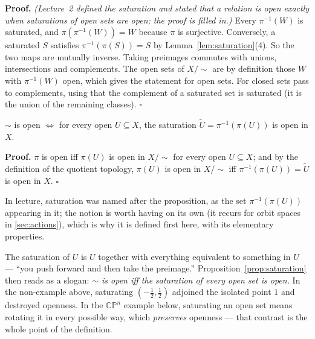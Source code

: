\documentclass[11pt]{report}
\makeatletter
\newcounter{thmcounter}[section]
\renewenvironment{proof}[1][Proof]{\noindent\textbf{#1.} }{\hfill$\square$\par\vspace{5pt}}
\newcommand{\thmlabel}[1]{\edef\@currentlabel{\arabic{section}.\arabic{thmcounter}}\label{#1}}
\makeatother
\begin{document}
\begin{proof}
\textit{(Lecture~2 defined the saturation and stated that a relation is open exactly when saturations of open sets are open; the proof is filled in.)} Every $\pi^{-1}(W)$ is saturated, and $\pi(\pi^{-1}(W)) = W$ because $\pi$ is surjective. Conversely, a saturated $S$ satisfies $\pi^{-1}(\pi(S)) = S$ by Lemma~\ref{lem:saturation}(4). So the two maps are mutually inverse. Taking preimages commutes with unions, intersections and complements. The open sets of $X/{\sim}$ are by definition those $W$ with $\pi^{-1}(W)$ open, which gives the statement for open sets. For closed sets pass to complements, using that the complement of a saturated set is saturated (it is the union of the remaining classes).
\end{proof}

\begin{propbox}\thmlabel{prop:saturation}
$\sim$ is open $\iff$ for every open $U \subseteq X$, the saturation $\tilde U = \pi^{-1}(\pi(U))$ is open in $X$.
\end{propbox}

\begin{proof}
$\pi$ is open iff $\pi(U)$ is open in $X/{\sim}$ for every open $U \subseteq X$; and by the definition of the quotient topology, $\pi(U)$ is open in $X/{\sim}$ iff $\pi^{-1}(\pi(U)) = \tilde U$ is open in $X$.
\end{proof}

In lecture, saturation was named after the proposition, as the set $\pi^{-1}(\pi(U))$ appearing in it; the notion is worth having on its own (it recurs for orbit spaces in \ref{sec:actions}), which is why it is defined first here, with its elementary properties.

\begin{rembox}[In Words]\label{rem:words}
The saturation of $U$ is $U$ together with everything equivalent to something in $U$ --- ``you push forward and then take the preimage.'' Proposition~\ref{prop:saturation} then reads as a slogan: \emph{$\sim$ is open iff the saturation of every open set is open.} In the non-example above, saturating $\left(-\tfrac12,\tfrac12\right)$ adjoined the isolated point $1$ and destroyed openness. In the $\mathbb{CP}^n$ example below, saturating an open set means rotating it in every possible way, which \emph{preserves} openness --- that contrast is the whole point of the definition.
\end{rembox}
\end{document}

